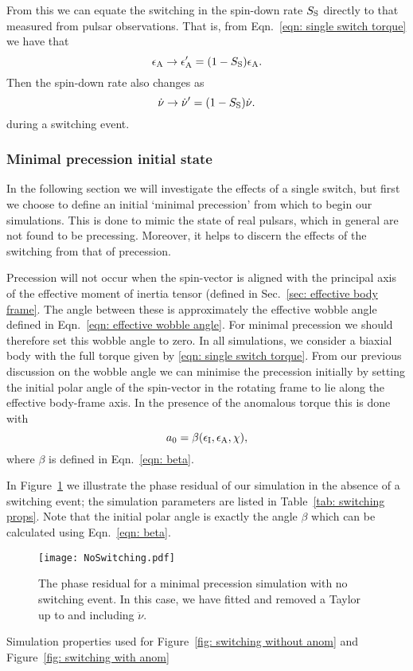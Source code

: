 \documentclass[../full_thesis/full_thesis.tex]{subfiles}
\newcommand{\thisdir}{../inertial_frame}
\begin{document}
From this we can equate the switching in the spin-down rate $S_{\mathrm{S}}$ directly to
that measured from pulsar observations. That is, from Eqn.~\eqref{eqn: single switch torque}
we have that
\begin{equation}
    \epsilon_{\mathrm{A}} \rightarrow \epsilon_{\mathrm{A}}' = (1-S_{\mathrm{S}})\epsilon_{\mathrm{A}}.
\label{eqn: epsA switch}
\end{equation}
Then the spin-down rate also changes as
\begin{equation}
    \dot{\nu} \rightarrow \dot{\nu}' = (1-S_{\mathrm{S}})\dot{\nu}.
\label{eqn: nudot switch}
\end{equation}
during a switching event.

\subsubsection{Minimal precession initial state}
In the following section we will investigate the effects of a single switch, but
first we choose to define an initial `minimal precession' from which to begin
our simulations. This is done to mimic the state of real pulsars, which in
general are not found to be precessing. Moreover, it helps to discern the
effects of the switching from that of precession.

Precession will not occur when the spin-vector is aligned with the principal
axis of the effective moment of inertia tensor (defined in Sec.~\ref{sec:
effective body frame}. The angle between these is approximately the
effective wobble angle defined in Eqn.~\eqref{eqn: effective wobble angle}.
For minimal precession we should therefore set this wobble angle to
zero. In all simulations, we consider a biaxial body with the full torque given
by \eqref{eqn: single switch torque}. From our previous discussion on the
wobble angle we can minimise the precession initially by setting the initial polar angle
of the spin-vector in the rotating frame to lie along the effective body-frame
axis. In the presence of the anomalous torque this is done with
\begin{equation}
a_{0} = \beta(\epsilon_{\mathrm{I}}, \epsilon_{\mathrm{A}}, \chi),
\end{equation}
where $\beta$ is defined in Eqn.~\ref{eqn: beta}.

In Figure~\ref{fig: no switching} we illustrate the phase residual of our
simulation in the absence of a switching event; the simulation parameters are
listed in Table~\ref{tab: switching props}. Note that the initial polar angle
is exactly the angle $\beta$ which can be calculated using Eqn.~\eqref{eqn:
beta}.
\begin{figure}[htb]
\texttt{[image: NoSwitching.pdf]}
\caption{The phase residual for a minimal precession simulation with no
         switching event. In this case, we have fitted and removed a Taylor
         up to and including $\ddot{\nu}$.}
\label{fig: no switching}
\end{figure}
\begin{table}[htb]
\centering

\caption{Simulation properties used for Figure~\ref{fig: switching without anom}
and Figure~\ref{fig: switching with anom}}
\label{tab: switching props}
\end{table}
\end{document}
